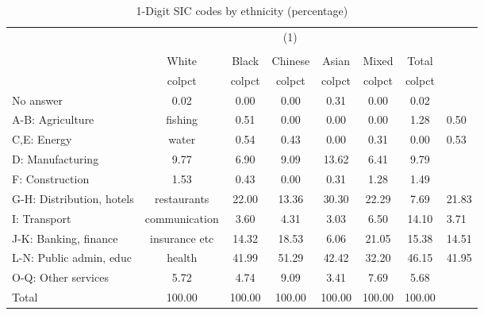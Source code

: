\begin{table}[htbp]\centering
\def\sym#1{\ifmmode^{#1}\else\(^{#1}\)\fi}
\caption{1-Digit SIC codes by ethnicity (percentage)}
\begin{tabular}{l*{6}{c}}
\hline\hline
          &                                    \\
          &                                       \\
          &    White&    Black&  Chinese&    Asian&    Mixed&    Total\\
          &   colpct&   colpct&   colpct&   colpct&   colpct&   colpct\\
\hline
No answer &     0.02&     0.00&     0.00&     0.31&     0.00&     0.02\\
A-B: Agriculture & fishing&     0.51&     0.00&     0.00&     0.00&     1.28&     0.50\\
C,E: Energy & water&     0.54&     0.43&     0.00&     0.31&     0.00&     0.53\\
D: Manufacturing&     9.77&     6.90&     9.09&    13.62&     6.41&     9.79\\
F: Construction&     1.53&     0.43&     0.00&     0.31&     1.28&     1.49\\
G-H: Distribution, hotels & restaurants&    22.00&    13.36&    30.30&    22.29&     7.69&    21.83\\
I: Transport & communication&     3.60&     4.31&     3.03&     6.50&    14.10&     3.71\\
J-K: Banking, finance & insurance etc&    14.32&    18.53&     6.06&    21.05&    15.38&    14.51\\
L-N: Public admin, educ & health&    41.99&    51.29&    42.42&    32.20&    46.15&    41.95\\
O-Q: Other services&     5.72&     4.74&     9.09&     3.41&     7.69&     5.68\\
Total     &   100.00&   100.00&   100.00&   100.00&   100.00&   100.00\\
\hline\hline
\end{tabular}
\end{table}

